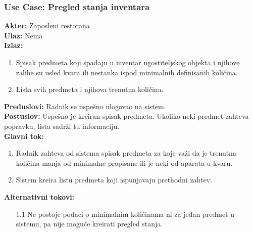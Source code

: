 \documentclass{article}
\begin{document}
\subsubsection{\textbf{Use Case}: Pregled stanja inventara}
\textbf{Akter:} Zaposleni restorana\\
\textbf{Ulaz:} Nema\\
\textbf{Izlaz:} 
\begin{enumerate}
	\item Spisak predmeta koji spadaju u inventar ugostiteljskog objekta i njihove zalihe su usled kvara ili nestanka ispod minimalnih definisanih količina.
	\item Lista svih predmeta i njihova trenutna količina.
\end{enumerate} 
\textbf{Preduslovi:} Radnik se uspešno ulogovao na sistem.\\
\textbf{Postuslov:} Uspešno je kreiran spisak predmeta. Ukoliko neki predmet zahteva popravku, lista sadrži tu informaciju.\\
\textbf{Glavni tok:} 
\begin{enumerate}
	\item Radnik zahteva od sistema spisak predmeta za koje važi da je trenutna količina manja od minimalne propisane ili je neki od aparata u kvaru.
	\item Sistem kreira listu predmeta koji ispunjavaju prethodni zahtev.
\end{enumerate}
\textbf{Alternativni tokovi:}
\begin{itemize}
\item [1.1] Ne postoje podaci o minimalnim količinama ni za jedan predmet u sistemu, pa nije moguće kreirati pregled stanja.
\end{itemize}
\end{document}
